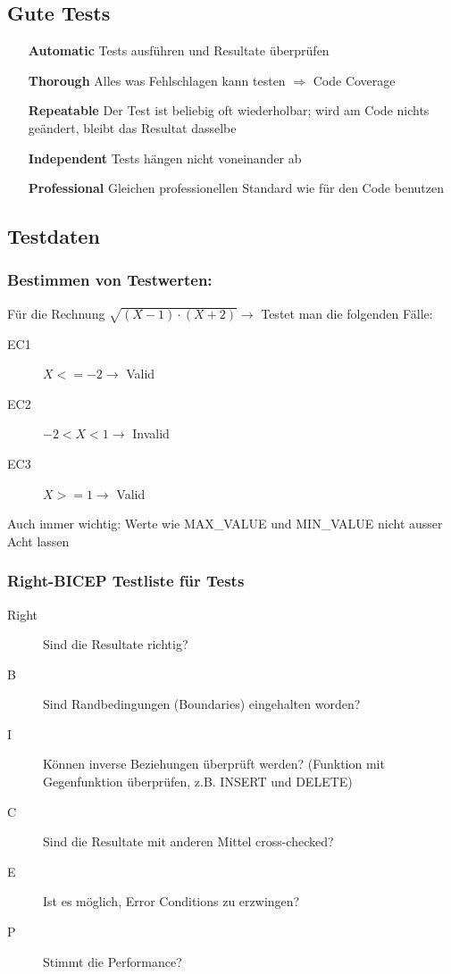 \documentclass[a4paper,10pt]{article}
\newcommand{\Bold}[1]{\textbf{#1}} %
\newcommand{\Ra}{\Rightarrow}
\begin{document}
\subsection{Gute Tests}
\begin{itemize}
	\item[\Bold {Automatic}] 		Tests ausführen und Resultate überprüfen
	\item[\Bold {Thorough}] 		Alles was Fehlschlagen kann testen $\Ra$ Code Coverage
	\item[\Bold {Repeatable}] 	Der Test ist beliebig oft wiederholbar; wird am Code nichts geändert, bleibt das Resultat dasselbe
	\item[\Bold {Independent}]	Tests hängen nicht voneinander ab
	\item[\Bold {Professional}] Gleichen professionellen Standard wie für den Code benutzen
\end{itemize}

\subsection{Testdaten}
\subsubsection{Bestimmen von Testwerten:}
Für die Rechnung $\sqrt{(X-1)\cdot(X+2)}\to$ Testet man die folgenden Fälle:
\begin{description}
\item[EC1] $X<=-2\to$ Valid
\item[EC2] $-2<X<1\to$ Invalid
\item[EC3] $X>=1\to$ Valid
\end{description}
Auch immer wichtig: Werte wie MAX\_$ $VALUE und MIN\_$ $VALUE nicht ausser Acht lassen
\subsubsection{Right-BICEP Testliste für Tests}
\begin{description}
\item [Right] Sind die Resultate richtig?
\item [B] Sind Randbedingungen (Boundaries) eingehalten worden?
\item [I] Können inverse Beziehungen überprüft werden? (Funktion mit Gegenfunktion überprüfen, z.B. INSERT und DELETE)
\item [C] Sind die Resultate mit anderen Mittel cross-checked?
\item [E] Ist es möglich, Error Conditions zu erzwingen?
\item [P] Stimmt die Performance?
\end{description}
\end{document}
